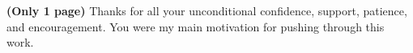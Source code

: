 \textbf{(Only 1 page)} Thanks for all your unconditional confidence, support, patience, and encouragement. You were my main motivation for pushing through this work.
